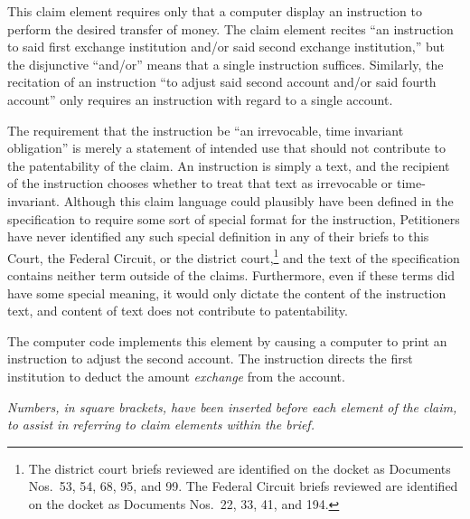 \documentclass{scotus}
\begin{document}

This claim element requires only that a computer display an instruction to
perform the desired transfer of money. The claim element recites ``an
instruction to said first exchange institution and/or said second exchange
institution,'' but the disjunctive ``and/or'' means that a single instruction
suffices. Similarly, the recitation of an instruction ``to adjust said second
account and/or said fourth account'' only requires an instruction with regard to
a single account.

The requirement that the instruction be ``an irrevocable, time invariant
obligation'' is merely a statement of intended use that should not contribute to
the patentability of the claim. An instruction is simply a text, and the
recipient of the instruction chooses whether to treat that text as irrevocable
or time-invariant. Although this claim language could plausibly have been
defined in the specification to require some sort of special format for the
instruction, Petitioners have never identified any such special definition in
any of their briefs to this Court, the Federal Circuit, or the district
court,\footnote{The district court briefs reviewed are identified on the docket
as Documents Nos.\ 53, 54, 68, 95, and 99. The Federal Circuit briefs reviewed
are identified on the docket as Documents Nos.\ 22, 33, 41, and 194.}
and the text of the
specification contains neither term outside of the claims. Furthermore, even if
these terms did have some special meaning, it would only dictate the content of
the instruction text, and content of text does not contribute to patentability.

The computer code implements this element by causing a computer to print an
instruction to adjust the second account. The instruction directs the
first institution to deduct the amount \emph{exchange} from the account.


\emph{Numbers, in square brackets, have been inserted before each element of the
claim, to assist in referring to claim elements within the brief.}

\wholeclaim
\end{document}
